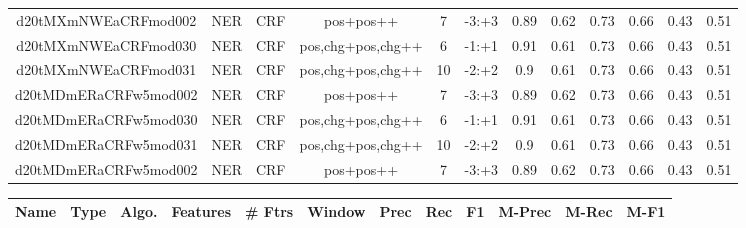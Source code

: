 \documentclass[a4paper]{article}
\begin{document}
\begin{landscape}
\begin{center}
\begin{tabular}{ |c|c|c|c|c|c|c|c|c|c|c|c|}
 	
 
 	
 		
 		\small{ d20tMXmNWEaCRFmod002 } & NER & CRF & pos+pos++  &  7 &  -3:+3  &  0.89 & 0.62 & 0.73  &  0.66 & 0.43 & 0.51 \\
 		

 	
 
 	
 		
 		\small{ d20tMXmNWEaCRFmod030 } & NER & CRF & pos,chg+pos,chg++  &  6 &  -1:+1  &  0.91 & 0.61 & 0.73  &  0.66 & 0.43 & 0.51 \\
 		

 	
 
 	
 		
 		\small{ d20tMXmNWEaCRFmod031 } & NER & CRF & pos,chg+pos,chg++  &  10 &  -2:+2  &  0.9 & 0.61 & 0.73  &  0.66 & 0.43 & 0.51 \\
 		

 	
 
 	
 		
 		\small{ d20tMDmERaCRFw5mod002 } & NER & CRF & pos+pos++  &  7 &  -3:+3  &  0.89 & 0.62 & 0.73  &  0.66 & 0.43 & 0.51 \\
 		

 	
 
 	
 		
 		\small{ d20tMDmERaCRFw5mod030 } & NER & CRF & pos,chg+pos,chg++  &  6 &  -1:+1  &  0.91 & 0.61 & 0.73  &  0.66 & 0.43 & 0.51 \\
 		

 	
 
 	
 		
 		\small{ d20tMDmERaCRFw5mod031 } & NER & CRF & pos,chg+pos,chg++  &  10 &  -2:+2  &  0.9 & 0.61 & 0.73  &  0.66 & 0.43 & 0.51 \\
 		

 	
 
 	
 		
 		\small{ d20tMDmERaCRFw5mod002 } & NER & CRF & pos+pos++  &  7 &  -3:+3  &  0.89 & 0.62 & 0.73  &  0.66 & 0.43 & 0.51 \\
 		
 \hline
\end{tabular}
\end{center}




\begin{center}
\begin{tabular}{ |c|c|c|c|c|c|c|c|c|c|c|c|} 
 \hline
 	Name & Type & Algo. & Features & \# Ftrs & Window & Prec & Rec & F1 & M-Prec & M-Rec & M-F1\\
 \hline


\end{tabular}
\end{center}
\end{landscape}
\end{document}
